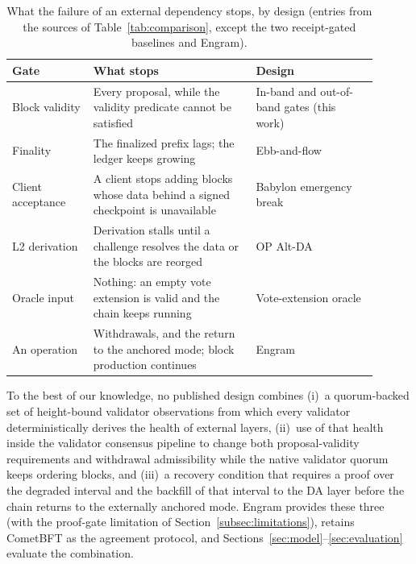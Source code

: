\begin{table}[!tbp]
\caption{What the failure of an external dependency stops, by design (entries
from the sources of Table~\ref{tab:comparison}, except the two receipt-gated baselines and Engram).}
\label{tab:gates}
\centering
\footnotesize
\renewcommand{\arraystretch}{1.03}
\begin{tabular}{@{}p{0.2\linewidth}p{0.4\linewidth}p{0.3\linewidth}@{}}
\toprule
\textbf{Gate} & \textbf{What stops} & \textbf{Design} \\
\midrule
Block validity & Every proposal, while the validity predicate cannot be satisfied & In-band and out-of-band gates (this work) \\
Finality & The finalized prefix lags; the ledger keeps growing & Ebb-and-flow \\
Client acceptance & A client stops adding blocks whose data behind a signed checkpoint is unavailable & Babylon emergency break \\
L2 derivation & Derivation stalls until a challenge resolves the data or the blocks are reorged & OP Alt-DA \\
Oracle input & Nothing: an empty vote extension is valid and the chain keeps running & Vote-extension oracle \\
An operation & Withdrawals, and the return to the anchored mode; block production continues & Engram \\
\bottomrule
\end{tabular}
\end{table}

To the best of our knowledge, no published design combines (i)~a quorum-backed
set of height-bound validator observations from which every validator
deterministically derives the health of external layers, (ii)~use of that
health inside the validator consensus pipeline to change both proposal-validity
requirements and withdrawal admissibility while the native validator quorum
keeps ordering blocks, and (iii)~a recovery condition that requires a proof over the degraded
interval and the backfill of that interval to the DA layer before the chain
returns to the externally anchored mode. Engram provides these three (with the proof-gate limitation of
Section~\ref{subsec:limitations}), retains CometBFT as the agreement protocol,
and Sections~\ref{sec:model}--\ref{sec:evaluation} evaluate the combination.


